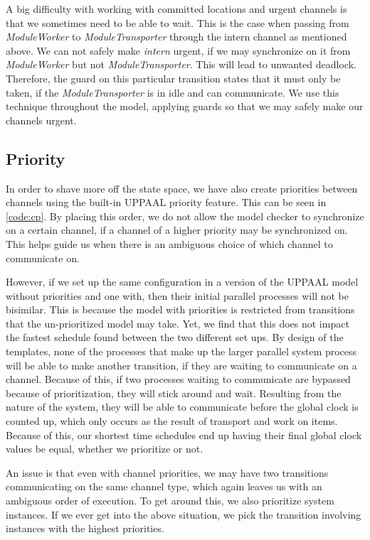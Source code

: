 A big difficulty with working with committed locations and urgent channels is that we sometimes need to be able to wait. This is the case when passing from \emph{ModuleWorker} to \emph{ModuleTransporter} through the intern channel as mentioned above. We can not safely make \emph{intern} urgent, if we may synchronize on it from \emph{ModuleWorker} but not \emph{ModuleTransporter}. This will lead to unwanted deadlock. Therefore, the guard on this particular transition states that it must only be taken, if the \emph{ModuleTransporter} is in idle and can communicate. We use this technique throughout the model, applying guards so that we may safely make our channels urgent. 

\subsection{Priority}
In order to shave more off the state space, we have also create priorities between channels using the built-in UPPAAL priority feature. This can be seen in \cref{code:cp}. By placing this order, we do not allow the model checker to synchronize on a certain channel, if a channel of a higher priority may be synchronized on. This helps guide us when there is an ambiguous choice of which channel to communicate on.

However, if we set up the same configuration in a version of the UPPAAL model without priorities and one with, then their initial parallel processes will not be bisimilar. This is because the model with priorities is restricted from transitions that the un-prioritized model may take. Yet, we find that this does not impact the fastest schedule found between the two different set ups. By design of the templates, none of the processes that make up the larger parallel system process will be able to make another transition, if they are waiting to communicate on a channel. Because of this, if two processes waiting to communicate are bypassed because of prioritization, they will stick around and wait. Resulting from the nature of the system, they will be able to communicate before the global clock is counted up, which only occurs as the result of transport and work on items. Because of this, our shortest time schedules end up having their final global clock values be equal, whether we prioritize or not.  

An issue is that even with channel priorities, we may have two transitions communicating on the same channel type, which again leaves us with an ambiguous order of execution. To get around this, we also prioritize system instances. If we ever get into the above situation, we pick the transition involving instances with the highest priorities. 

